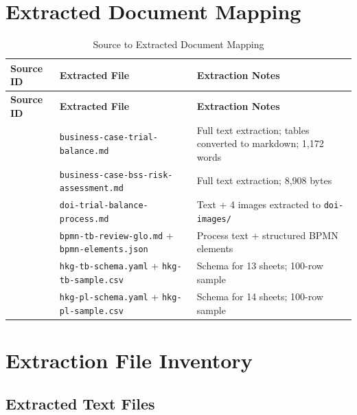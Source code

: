 \section{Extracted Document Mapping}
\label{sec:extracted-mapping}

\begin{longtable}{@{}C{2cm}L{5cm}L{6.5cm}@{}}
\caption{Source to Extracted Document Mapping}
\label{tab:extracted-mapping} \\
\toprule
\textbf{Source ID} & \textbf{Extracted File} & \textbf{Extraction Notes} \\
\midrule
\endfirsthead
\toprule
\textbf{Source ID} & \textbf{Extracted File} & \textbf{Extraction Notes} \\
\midrule
\endhead
{} & \texttt{business-case-trial-balance.md} & Full text extraction; tables converted to markdown; 1,172 words \\
 & \texttt{business-case-bss-risk-assessment.md} & Full text extraction; 8,908 bytes \\
 & \texttt{doi-trial-balance-process.md} & Text + 4 images extracted to \texttt{doi-images/} \\
 & \texttt{bpmn-tb-review-glo.md} + \texttt{bpmn-elements.json} & Process text + structured BPMN elements \\
 & \texttt{hkg-tb-schema.yaml} + \texttt{hkg-tb-sample.csv} & Schema for 13 sheets; 100-row sample \\
 & \texttt{hkg-pl-schema.yaml} + \texttt{hkg-pl-sample.csv} & Schema for 14 sheets; 100-row sample \\
\bottomrule
\end{longtable}

\section{Extraction File Inventory}
\label{sec:extraction-inventory}

\subsection{Extracted Text Files}


